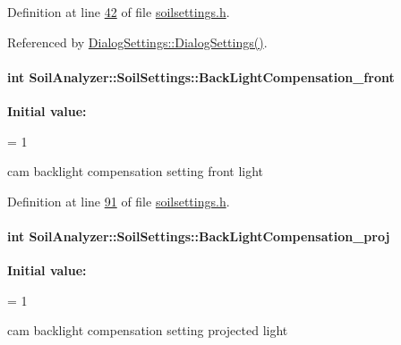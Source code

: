 Definition at line \hyperlink{soilsettings_8h_source_l00042}{42} of file \hyperlink{soilsettings_8h_source}{soilsettings.\+h}.



Referenced by \hyperlink{dialogsettings_8cpp_source_l00005}{Dialog\+Settings\+::\+Dialog\+Settings()}.

\hypertarget{class_soil_analyzer_1_1_soil_settings_ae066beb7ff7d4274b5b370140cf3deb5}{}
\paragraph[{Back\+Light\+Compensation\+\_\+front}]{\setlength{\rightskip}{0pt plus 5cm}int Soil\+Analyzer\+::\+Soil\+Settings\+::\+Back\+Light\+Compensation\+\_\+front}\label{class_soil_analyzer_1_1_soil_settings_ae066beb7ff7d4274b5b370140cf3deb5}
{\bfseries Initial value\+:}
\begin{DoxyCode}
=
      1
\end{DoxyCode}
cam backlight compensation setting front light 

Definition at line \hyperlink{soilsettings_8h_source_l00091}{91} of file \hyperlink{soilsettings_8h_source}{soilsettings.\+h}.

\hypertarget{class_soil_analyzer_1_1_soil_settings_a34c82ebc3bd8920275fd9f38265d35d2}{}
\paragraph[{Back\+Light\+Compensation\+\_\+proj}]{\setlength{\rightskip}{0pt plus 5cm}int Soil\+Analyzer\+::\+Soil\+Settings\+::\+Back\+Light\+Compensation\+\_\+proj}\label{class_soil_analyzer_1_1_soil_settings_a34c82ebc3bd8920275fd9f38265d35d2}
{\bfseries Initial value\+:}
\begin{DoxyCode}
=
      1
\end{DoxyCode}
cam backlight compensation setting projected light 

